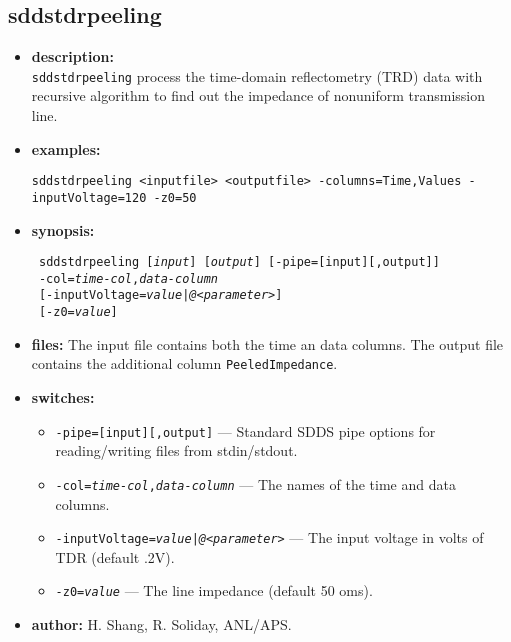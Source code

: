 \newpage 
\subsection{sddstdrpeeling} 
\label{sddstdrpeeling} 
 
\begin{itemize} 
\item {\bf description:} \hspace*{1mm}\\ 
{\tt sddstdrpeeling} process the time-domain reflectometry (TRD) data with recursive algorithm to find out the impedance of nonuniform transmission line.
\item {\bf examples:} 
\begin{flushleft}
{\tt sddstdrpeeling <inputfile> <outputfile> -columns=Time,Values -inputVoltage=120 -z0=50 }
\end{flushleft} 
\item {\bf synopsis:}  
\begin{flushleft}
{\tt 
sddstdrpeeling [{\em input}] [{\em output}] [-pipe=[input][,output]] \\ \
-col={\em time-col},{\em data-column} \\ \
[-inputVoltage={\em value}|{\em @<parameter>}] \\ \
[-z0={\em value}]}
\end{flushleft} 
\item {\bf files:} 
The input file contains both the time an data columns. The output file contains the additional column {\tt PeeledImpedance}.
\item {\bf switches:} 
    \begin{itemize} 
    \item {\tt -pipe=[input][,output]} --- Standard SDDS pipe options for reading/writing files from stdin/stdout.
    \item {\tt -col={\em time-col},{\em data-column}} --- The names of the time and data columns.
    \item {\tt -inputVoltage={\em value}|{\em @<parameter>}} --- The input voltage in volts of TDR (default .2V).
    \item {\tt -z0={\em value}} --- The line impedance (default 50 oms).
\end{itemize} 

\item {\bf author:} H. Shang, R. Soliday, ANL/APS. 
\end{itemize} 
 
